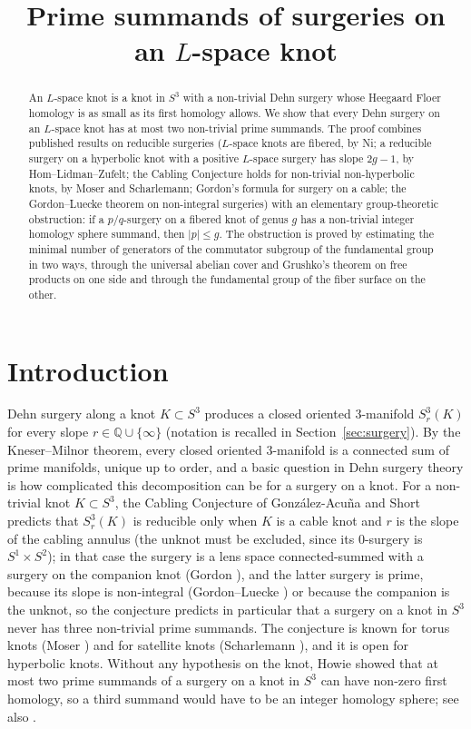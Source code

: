 \documentclass[12pt]{article}
\title{Prime summands of surgeries on an \(L\)-space knot}
\author{}
\date{}
\newcommand{\Q}{\mathbb Q}
\newcommand{\Surg}[2]{S^3_{#1}(#2)}
\theoremstyle{definition}
\theoremstyle{remark}
\begin{document}
\maketitle

\begin{abstract}
An \(L\)-space knot is a knot in \(S^3\) with a non-trivial Dehn surgery
whose Heegaard Floer homology is as small as its first homology allows.
We show that every Dehn surgery on an \(L\)-space knot has at most two
non-trivial prime summands. The proof combines published results on
reducible surgeries (\(L\)-space knots are fibered, by Ni; a reducible
surgery on a hyperbolic knot with a positive \(L\)-space surgery has slope
\(2g-1\), by Hom--Lidman--Zufelt; the Cabling Conjecture holds for
non-trivial non-hyperbolic knots, by Moser and Scharlemann; Gordon's
formula for
surgery on a cable; the Gordon--Luecke theorem on non-integral surgeries)
with an elementary group-theoretic obstruction: if a \(p/q\)-surgery on a
fibered knot of genus \(g\) has a non-trivial integer homology sphere
summand, then \(|p|\le g\). The obstruction is proved by estimating the
minimal number of generators of the commutator subgroup of the
fundamental group in two ways, through the universal abelian cover and
Grushko's theorem on free products on one side and through the
fundamental group of the fiber surface on the other.
\end{abstract}

\section{Introduction}\label{sec:intro}

Dehn surgery along a knot \(K\subset S^3\) produces a closed oriented
\(3\)-manifold \(\Surg{r}{K}\) for every slope
\(r\in\Q\cup\{\infty\}\) (notation is recalled in
Section~\ref{sec:surgery}). By the Kneser--Milnor theorem, every closed
oriented \(3\)-manifold is a connected sum of prime manifolds, unique up to
order, and a basic question in Dehn surgery theory is how complicated this
decomposition can be for a surgery on a knot. For a non-trivial knot
\(K\subset S^3\), the Cabling Conjecture of Gonz\'alez-Acu\~na and Short
\cite{GAS1986} predicts that \(\Surg{r}{K}\) is reducible only when
\(K\) is a cable knot and \(r\) is the slope of the cabling annulus (the
unknot must be excluded, since its \(0\)-surgery is \(S^1\times S^2\)); in
that case the surgery is a lens space connected-summed
with a surgery on the companion knot (Gordon \cite{Gordon1983}), and the
latter surgery is prime, because its slope is non-integral (Gordon--Luecke
\cite{GordonLuecke1987}) or because the companion is the unknot, so the
conjecture predicts in particular that a
surgery on a knot in \(S^3\) never has three non-trivial prime summands.
The conjecture is known for
torus knots (Moser \cite{Moser1971}) and for satellite knots (Scharlemann
\cite{Scharlemann1990}), and it is open for hyperbolic knots. Without any
hypothesis on the knot, Howie \cite{Howie2002} showed that at most two
prime summands of a surgery on a knot in \(S^3\) can have non-zero first
homology, so a third summand would have to be an integer homology sphere;
see also \cite{Howie2010}.
\end{document}
